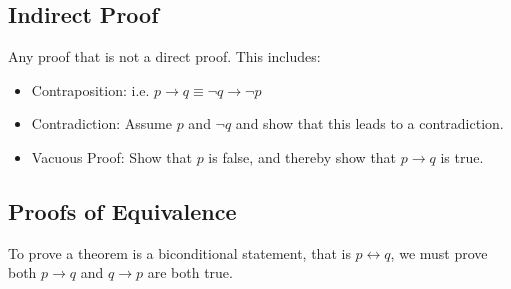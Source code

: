 \documentclass[12pt letter]{report}
\begin{document}
\subsection{Indirect Proof}

Any proof that is not a direct proof. This includes:

\begin{itemize}
  \item Contraposition: i.e. $p \to q \equiv \neg q \to \neg p$
  \item Contradiction: Assume $p$ and $\neg q$ and show that this leads to a contradiction.
  \item Vacuous Proof: Show that $p$ is false, and thereby show that $p \to q$ is true.
\end{itemize}



\subsection{Proofs of Equivalence}

To prove a theorem is a biconditional statement, that is $p \leftrightarrow q$, we must prove both $p \to q$ and $q \to
  p$ are both true.
\end{document}
